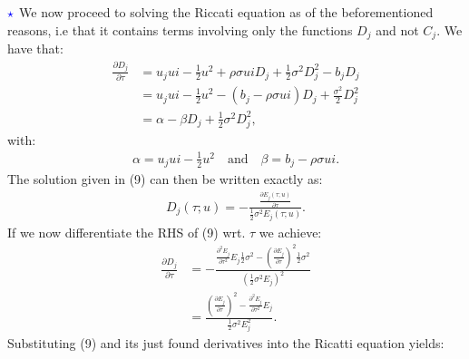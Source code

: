 \documentclass[11pt]{article}
\numberwithin{equation}{section}
\begin{document}
$\textcolor{blue}{\star}$ We now proceed to solving the Riccati equation as of
the beforementioned reasons, i.e that it contains terms involving only the
functions $D_j$ and not $C_j$. We have that:
\begin{align*}
    \frac{\partial D_j}{\partial \tau}&=u_jui-\frac{1}{2}u^2+\rho\sigma u iD_j+\frac{1}{2}\sigma^2D_j^2-b_jD_j\\
    &=u_jui-\frac{1}{2}u^2-(b_j-\rho\sigma u i)D_j+\frac{\sigma^2}{2}D_j^2\\
    &=\alpha-\beta D_j+\frac{1}{2}\sigma^2D_j^2,
\end{align*}
with:
\begin{align*}
    \alpha = u_j ui - \frac{1}{2}u^2 \quad \text{and} \quad \beta=b_j-\rho \sigma u i.
\end{align*}
The solution given in (9) can then be written exactly as:
\begin{align*}
    D_j(\tau;u)=-\frac{\frac{\partial E_j(\tau;u)}{\partial \tau}}{\frac{1}{2}\sigma^2E_j(\tau;u)}.
\end{align*}
If we now differentiate the RHS of (9) wrt. $\tau$ we achieve:
\begin{align*}
        \frac{\partial D_j}{\partial \tau}&=-\frac{\frac{\partial^2 E_j}{\partial\tau^2 }E_j\frac{1}{2}\sigma^2- \left ( \frac{\partial E_j}{\partial \tau}\right )^2 \frac{1}{2}\sigma^2}{\left ( \frac{1}{2}\sigma^2 E_j\right )^2}\\
        &=\frac{\left ( \frac{\partial E_j}{\partial \tau}\right )^2-\frac{\partial^2 E_j}{\partial\tau^2 }E_j}{\frac{1}{2}\sigma^2 E_j^2}.
\end{align*}
Substituting (9) and its just found derivatives into the Ricatti equation
yields:
\end{document}
